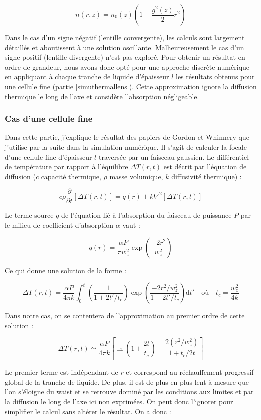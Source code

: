 $$
n(r,z) = n_0(z) \left( 1 \pm \frac{g^2(z)}{2}r^2\right)
$$

Dans le cas d'un signe négatif (lentille convergente), les calculs sont largement détaillés et aboutissent à une solution oscillante. Malheureusement le cas d'un signe positif (lentille divergente) n'est pas exploré. Pour obtenir un résultat en ordre de grandeur, nous avons donc opté pour une approche discrète numérique en appliquant à chaque tranche de liquide d'épaisseur $l$ les résultats obtenus pour une cellule fine (partie \ref{simuthermallens}). Cette approximation ignore la diffusion thermique le long de l'axe et considère l'absorption négligeable.

\subsubsection{Cas d'une cellule fine}\label{cellulefine}

Dans cette partie, j'explique le résultat des papiers de Gordon et Whinnery que j'utilise par la suite dans la simulation numérique. Il s'agit de calculer la focale d'une cellule fine d'épaisseur $l$ traversée par un faisceau gaussien. Le différentiel de température par rapport à l'équilibre $\Delta T(r,t)$ est décrit par l'équation de diffusion ($c$ capacité thermique, $\rho$ masse volumique, $k$ diffusivité thermique) :

$$
c\rho\frac{\partial}{\partial t}[\Delta T(r,t)] = \dot{q}(r) + k \nabla^2[\Delta T(r,t)]
$$

Le terme source $q$ de l'équation lié à l'absorption du faisceau de puissance $P$ par le milieu de coefficient d'absorption $\alpha$ vaut \cite{gordon_longtransient_1965} :

$$
\dot{q}(r) = \frac{\alpha P}{\pi w^2_z}\exp \left(\frac{-2r^2}{w^2_z} \right)
$$

Ce qui donne une solution de la forme \cite{gordon_longtransient_1965} :

$$
\Delta T(r,t) = \frac{\alpha P}{4\pi k} \int_0^t \left( \frac{1}{1+2t'/t_c} \right) \exp \left( \frac{-2r^2/w_z^2}{1+2t'/t_c} \right) \mathrm{d}t'
\quad \text{où} \quad
t_c = \frac{w_z^2}{4k}
$$

Dans notre cas, on se contentera de l'approximation au premier ordre de cette solution \cite{gordon_longtransient_1965} :

$$
\Delta T(r,t) \simeq \frac{\alpha P}{4\pi k} \left[ \ln\left( 1+\frac{2t}{t_c} \right) - \frac{2(r^2/w_z^2)}{1+t_c/2t} \right]
$$

Le premier terme est indépendant de $r$ et correspond au réchauffement progressif global de la tranche de liquide. De plus, il est de plus en plus lent à mesure que l'on s'éloigne du waist et se retrouve dominé par les conditions aux limites et par la diffusion le long de l'axe ici non exprimées. On peut donc l'ignorer \cite{gordon_longtransient_1965} pour simplifier le calcul sans altérer le résultat. On a donc :

